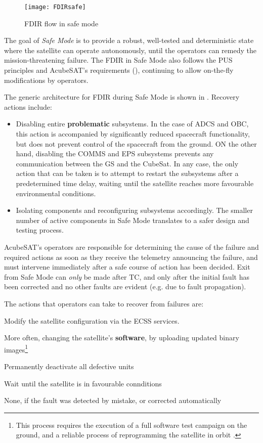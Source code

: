 \documentclass[a4paper,nobib]{tufte-book}
\begin{document}
\begin{figure}[h]
	\texttt{[image: FDIRsafe]}
	\caption{\acs{FDIR} flow in safe mode}
	\label{fig:safeflow}
\end{figure}


The goal of \emph{Safe Mode} is to provide a robust, well-tested and deterministic state where the satellite can operate autonomously, until the operators can remedy the mission-threatening failure. The \acs{FDIR} in Safe Mode also follows the \acs{PUS} principles and AcubeSAT's requirements (), continuing to allow on-the-fly modifications by operators.

The generic architecture for \acs{FDIR} during Safe Mode is shown in . Recovery actions include:
\begin{itemize}
	\item Disabling entire \textbf{problematic} subsystems. In the case of \acs{ADCS} and \acs{OBC}, this action is accompanied by significantly reduced spacecraft functionality, but does not prevent control of the spacecraft from the ground. ON the other hand, disabling the \acs{COMMS} and \acs{EPS} subsystems prevents any communication between the \acl{GS} and the CubeSat. In any case, the only action that can be taken is to attempt to restart the subsystems after a predetermined time delay, waiting until the satellite reaches more favourable environmental conditions.
	\item Isolating components and reconfiguring subsystems accordingly. The smaller number of active components in Safe Mode translates to a safer design and testing process.
\end{itemize}

AcubeSAT's operators are responsible for determining the cause of the failure and required actions as soon as they receive the telemetry announcing the failure, and must intervene immediately after a safe course of action has been decided. Exit from Safe Mode can \emph{only} be made after \acs{TC}, and only after the initial fault has been corrected and no other faults are evident (e.g. due to fault propagation).

The actions that operators can take to recover from failures are:
\begin{compactitem}
	\item Modify the satellite configuration via the \acs{ECSS} services.
	\item More often, changing the satellite's \textbf{software}, by uploading updated binary images\footnote{This process requires the execution of a full software test campaign on the ground, and a reliable process of reprogramming the satellite in orbit \autocite[45]{DDJF_OBSW}.}
	\item Permanently deactivate all defective units
	\item Wait until the satellite is in favourable connditions
	\item None, if the fault was detected by mistake, or corrected automatically
\end{compactitem}
\end{document}
